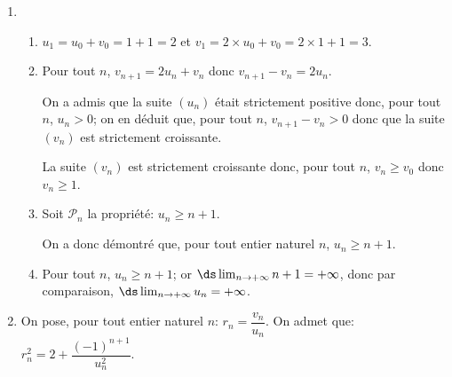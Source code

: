 \begin{enumerate}
\item 
	\begin{enumerate}
		\item $u_1=u_0+v_0=1+1=2$ et $v_1=2\times u_0+v_0 = 2\times 1+1=3$.
		
		\item %
Pour tout $n$, $v_{n+1}= 2u_n+v_n$ donc $v_{n+1}-v_n=2u_n$.

On a admis que la suite $(u_n)$ était strictement positive donc, pour tout $n$, $u_n>0$; on en déduit que, pour tout $n$, $v_{n+1}-v_n>0$ donc que la suite $(v_n)$ est strictement croissante.

La suite $(v_n)$ est strictement croissante	 donc, pour tout $n$, $v_n\geqslant v_0$ donc $v_n\geqslant 1$.
		
		\item Soit $\mathcal P_n$ la propriété: $u_n \geqslant  n + 1$.
		
		
On a donc démontré que, pour tout entier naturel $n$, $u_n\geqslant n+1$.		
		
		\item Pour tout $n$, $u_n\geqslant n+1$; or $\ds\lim_{n\to +\infty} n+1=+\infty$, donc par comparaison, $\ds\lim_{n\to +\infty} u_n=+\infty$.
	\end{enumerate}
	\item On pose, pour tout entier naturel $n$: $r_n = \dfrac{v_n}{u_n}.$
On admet que: $r_n^2 = 2 + \dfrac{(- 1)^{n+1}}{u_n^2}$.


\end{enumerate}
